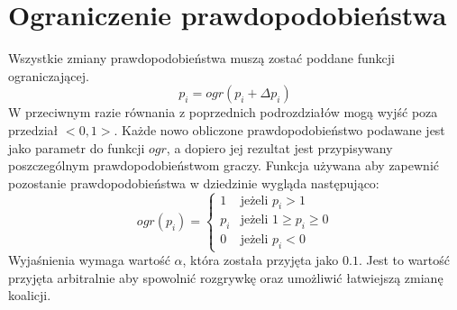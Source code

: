 
\section{Ograniczenie prawdopodobieństwa}
\label{sec:ograniczenie}
Wszystkie zmiany prawdopodobieństwa muszą zostać poddane funkcji ograniczającej.
\begin{equation} \label{eq:ograniczenie}
p_i = ogr( p_i + \Delta p_i)
\end{equation}
W przeciwnym razie równania z poprzednich podrozdziałów mogą wyjść poza przedział $<0,1>$. Każde nowo obliczone prawdopodobieństwo podawane jest jako parametr do funkcji $ogr$, a dopiero jej rezultat jest przypisywany poszczególnym prawdopodobieństwom graczy. Funkcja używana aby zapewnić pozostanie prawdopodobieństwa w dziedzinie wygląda następująco:
\begin{displaymath}
ogr(p_i) = \left\{
\begin{array}{ll}
1 & \text{jeżeli } p_i > 1 \\
p_i & \text{jeżeli } 1 \geq p_i \geq 0 \\
0 & \text{jeżeli } p_i < 0
\end{array} 
\right.
\end{displaymath}
Wyjaśnienia wymaga wartość $\alpha$, która została przyjęta jako $0.1$. Jest to wartość przyjęta arbitralnie aby spowolnić rozgrywkę oraz umożliwić łatwiejszą zmianę koalicji. 


